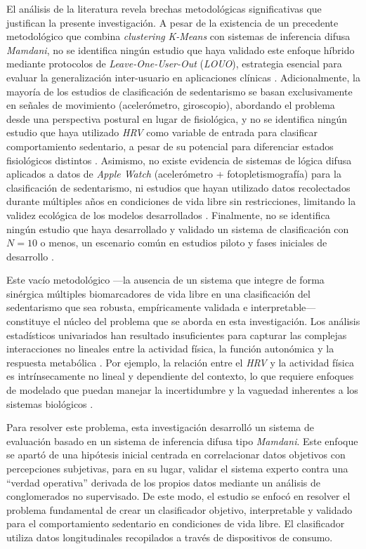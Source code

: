 El análisis de la literatura revela brechas metodológicas significativas que justifican la presente investigación. A pesar de la existencia de un precedente metodológico que combina \textit{clustering} \textit{K-Means} con sistemas de inferencia difusa \textit{Mamdani}, no se identifica ningún estudio que haya validado este enfoque híbrido mediante protocolos de \textit{Leave-One-User-Out} (\textit{LOUO}), estrategia esencial para evaluar la generalización inter-usuario en aplicaciones clínicas \cite{Rehman2024LOSO,Mathew2024LOSO,Bassani2025DLHAR}. Adicionalmente, la mayoría de los estudios de clasificación de sedentarismo se basan exclusivamente en señales de movimiento (acelerómetro, giroscopio), abordando el problema desde una perspectiva postural en lugar de fisiológica, y no se identifica ningún estudio que haya utilizado \textit{HRV} como variable de entrada para clasificar comportamiento sedentario, a pesar de su potencial para diferenciar estados fisiológicos distintos \cite{Godkin2025Context,Marino2024ARIC}. Asimismo, no existe evidencia de sistemas de lógica difusa aplicados a datos de \textit{Apple Watch} (acelerómetro + fotopletismografía) para la clasificación de sedentarismo, ni estudios que hayan utilizado datos recolectados durante múltiples años en condiciones de vida libre sin restricciones, limitando la validez ecológica de los modelos desarrollados \cite{Fuller2021Predicting}. Finalmente, no se identifica ningún estudio que haya desarrollado y validado un sistema de clasificación con $N=10$ o menos, un escenario común en estudios piloto y fases iniciales de desarrollo \cite{Bolger2013}.

Este vacío metodológico ---la ausencia de un sistema que integre de forma sinérgica múltiples biomarcadores de vida libre en una clasificación del sedentarismo que sea robusta, empíricamente validada e interpretable--- constituye el núcleo del problema que se aborda en esta investigación. Los análisis estadísticos univariados han resultado insuficientes para capturar las complejas interacciones no lineales entre la actividad física, la función autonómica y la respuesta metabólica \cite{Aubert2022GlobalMatrix}. Por ejemplo, la relación entre el \textit{HRV} y la actividad física es intrínsecamente no lineal y dependiente del contexto, lo que requiere enfoques de modelado que puedan manejar la incertidumbre y la vaguedad inherentes a los sistemas biológicos \cite{Deka2023Nonlinear}.

Para resolver este problema, esta investigación desarrolló un sistema de evaluación basado en un sistema de inferencia difusa tipo \textit{Mamdani}. Este enfoque se apartó de una hipótesis inicial centrada en correlacionar datos objetivos con percepciones subjetivas, para en su lugar, validar el sistema experto contra una ``verdad operativa'' derivada de los propios datos mediante un análisis de conglomerados no supervisado. De este modo, el estudio se enfocó en resolver el problema fundamental de crear un clasificador objetivo, interpretable y validado para el comportamiento sedentario en condiciones de vida libre. El clasificador utiliza datos longitudinales recopilados a través de dispositivos de consumo.

